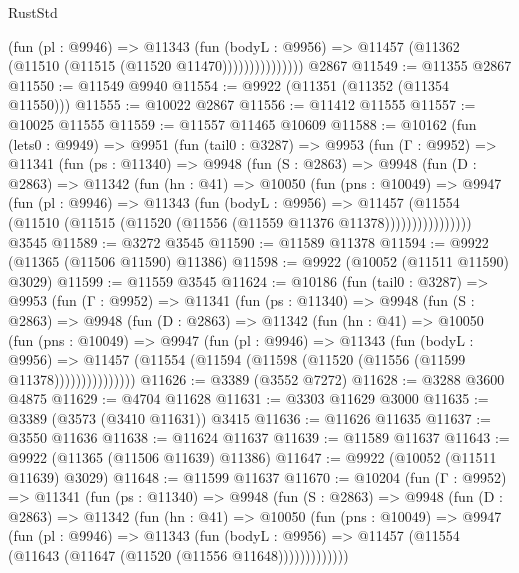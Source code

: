 \begin{lexlean}{RustStd}
\begin{coremodule}
                      (fun (pl : @9946) =>
                      @11343
                        (fun (bodyL : @9956) =>
                        @11457 (@11362 (@11510 (@11515 (@11520 @11470)))))))))))))))
    @2867
@11549 := @11355 @2867
@11550 := @11549 @9940
@11554 := @9922 (@11351 (@11352 (@11354 @11550)))
@11555 := @10022 @2867
@11556 := @11412 @11555
@11557 := @10025 @11555
@11559 := @11557 @11465 @10609
@11588 := @10162
    (fun (lets0 : @9949) =>
    @9951
      (fun (tail0 : @3287) =>
      @9953
        (fun (Γ : @9952) =>
        @11341
          (fun (ps : @11340) =>
          @9948
            (fun (S : @2863) =>
            @9948
              (fun (D : @2863) =>
              @11342
                (fun (hn : @41) =>
                @10050
                  (fun (pns : @10049) =>
                  @9947
                    (fun (pl : @9946) =>
                    @11343
                      (fun (bodyL : @9956) =>
                      @11457
                        (@11554
                          (@11510 (@11515 (@11520 (@11556 (@11559 @11376 @11378))))))))))))))))
    @3545
@11589 := @3272 @3545
@11590 := @11589 @11378
@11594 := @9922 (@11365 (@11506 @11590) @11386)
@11598 := @9922 (@10052 (@11511 @11590) @3029)
@11599 := @11559 @3545
@11624 := @10186
    (fun (tail0 : @3287) =>
    @9953
      (fun (Γ : @9952) =>
      @11341
        (fun (ps : @11340) =>
        @9948
          (fun (S : @2863) =>
          @9948
            (fun (D : @2863) =>
            @11342
              (fun (hn : @41) =>
              @10050
                (fun (pns : @10049) =>
                @9947
                  (fun (pl : @9946) =>
                  @11343
                    (fun (bodyL : @9956) =>
                    @11457 (@11554 (@11594 (@11598 (@11520 (@11556 (@11599 @11378)))))))))))))))
@11626 := @3389 (@3552 @7272)
@11628 := @3288 @3600 @4875
@11629 := @4704 @11628
@11631 := @3303 @11629 @3000
@11635 := @3389 (@3573 (@3410 @11631)) @3415
@11636 := @11626 @11635
@11637 := @3550 @11636
@11638 := @11624 @11637
@11639 := @11589 @11637
@11643 := @9922 (@11365 (@11506 @11639) @11386)
@11647 := @9922 (@10052 (@11511 @11639) @3029)
@11648 := @11599 @11637
@11670 := @10204
    (fun (Γ : @9952) =>
    @11341
      (fun (ps : @11340) =>
      @9948
        (fun (S : @2863) =>
        @9948
          (fun (D : @2863) =>
          @11342
            (fun (hn : @41) =>
            @10050
              (fun (pns : @10049) =>
              @9947
                (fun (pl : @9946) =>
                @11343
                  (fun (bodyL : @9956) =>
                  @11457 (@11554 (@11643 (@11647 (@11520 (@11556 @11648)))))))))))))

\end{coremodule}
\end{lexlean}
